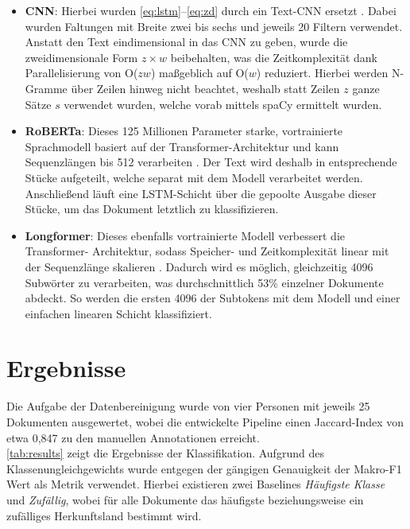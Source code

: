 \documentclass[bachelor,german]{info1thesis}
\begin{document}
\begin{itemize}
\item \textbf{CNN}: Hierbei wurden \autoref{eq:lstm}--\ref{eq:zd} durch ein Text-CNN ersetzt \cite{Kim2014}. Dabei wurden Faltungen mit Breite zwei bis sechs und jeweils 20 Filtern verwendet. Anstatt den Text eindimensional in das CNN zu geben, wurde die zweidimensionale Form $z \times w$ beibehalten, was die Zeitkomplexität dank Parallelisierung von O($zw$) maßgeblich auf O($w$) reduziert. Hierbei werden N-Gramme über Zeilen hinweg nicht beachtet, weshalb statt Zeilen $z$ ganze Sätze $s$ verwendet wurden, welche vorab mittels spaCy ermittelt wurden.
\item \textbf{RoBERTa}: Dieses 125 Millionen Parameter starke, vortrainierte Sprachmodell basiert auf der Transformer-Architektur und kann Sequenzlängen bis 512 verarbeiten \cite{Liu2019}. Der Text wird deshalb in entsprechende Stücke aufgeteilt, welche separat mit dem Modell verarbeitet werden. Anschließend läuft eine LSTM-Schicht über die gepoolte Ausgabe dieser Stücke, um das Dokument letztlich zu klassifizieren.
\item \textbf{Longformer}: Dieses ebenfalls vortrainierte Modell verbessert die Transformer- Architektur, sodass Speicher- und Zeitkomplexität linear mit der Sequenzlänge skalieren \cite{Beltagy2020}. Dadurch wird es möglich, gleichzeitig 4096 Subwörter zu verarbeiten, was durchschnittlich 53\% einzelner Dokumente abdeckt. So werden die ersten 4096 der Subtokens mit dem Modell und einer einfachen linearen Schicht klassifiziert. 
\end{itemize}
%


\chapter{Ergebnisse}

Die Aufgabe der Datenbereinigung wurde von vier Personen mit jeweils 25 Dokumenten ausgewertet, wobei die entwickelte Pipeline einen Jaccard-Index von etwa 0,847 zu den manuellen Annotationen erreicht. \\\autoref{tab:results} zeigt die Ergebnisse der Klassifikation. Aufgrund des Klassenungleichgewichts wurde entgegen der gängigen Genauigkeit der Makro-F1 Wert als Metrik verwendet. Hierbei existieren zwei Baselines \textit{Häufigste Klasse} und \textit{Zufällig}, wobei für alle Dokumente das häufigste beziehungsweise ein zufälliges Herkunftsland bestimmt wird.
\end{document}
